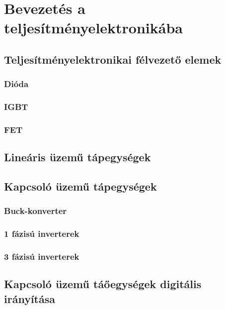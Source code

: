 \section{Bevezetés a teljesítményelektronikába}
\vspace{5cm}
\subsection{Teljesítményelektronikai félvezető elemek}
\subsubsection{Dióda}
\subsubsection{IGBT}
\subsubsection{FET}

\subsection{Lineáris üzemű tápegységek}


\subsection{Kapcsoló üzemű tápegységek}
\subsubsection{Buck-konverter}
\subsubsection{1 fázisú inverterek}
\subsubsection{3 fázisú inverterek}

\subsection{Kapcsoló üzemű táőegységek digitális irányítása}



\vspace{-1.5mm}
\newpage